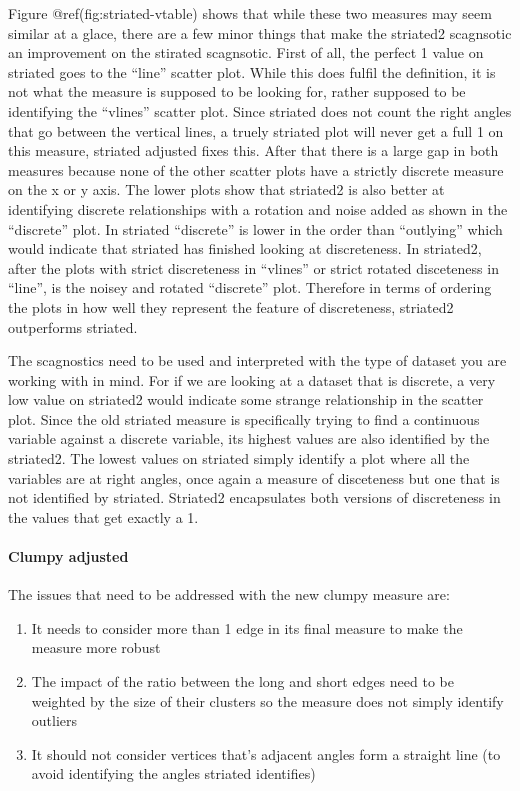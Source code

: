 Figure @ref(fig:striated-vtable) shows that while these two measures may
seem similar at a glace, there are a few minor things that make the
striated2 scagnsotic an improvement on the stirated scagnsotic. First of
all, the perfect 1 value on striated goes to the ``line'' scatter plot.
While this does fulfil the definition, it is not what the measure is
supposed to be looking for, rather supposed to be identifying the
``vlines'' scatter plot. Since striated does not count the right angles
that go between the vertical lines, a truely striated plot will never
get a full 1 on this measure, striated adjusted fixes this. After that
there is a large gap in both measures because none of the other scatter
plots have a strictly discrete measure on the x or y axis. The lower
plots show that striated2 is also better at identifying discrete
relationships with a rotation and noise added as shown in the
``discrete'' plot. In striated ``discrete'' is lower in the order than
``outlying'' which would indicate that striated has finished looking at
discreteness. In striated2, after the plots with strict discreteness in
``vlines'' or strict rotated disceteness in ``line'', is the noisey and
rotated ``discrete'' plot. Therefore in terms of ordering the plots in
how well they represent the feature of discreteness, striated2
outperforms striated.

The scagnostics need to be used and interpreted with the type of dataset
you are working with in mind. For if we are looking at a dataset that is
discrete, a very low value on striated2 would indicate some strange
relationship in the scatter plot. Since the old striated measure is
specifically trying to find a continuous variable against a discrete
variable, its highest values are also identified by the striated2. The
lowest values on striated simply identify a plot where all the variables
are at right angles, once again a measure of disceteness but one that is
not identified by striated. Striated2 encapsulates both versions of
discreteness in the values that get exactly a 1.

\hypertarget{clumpy-adjusted}{%
\paragraph{Clumpy adjusted}\label{clumpy-adjusted}}

The issues that need to be addressed with the new clumpy measure are:

\begin{enumerate}
\def\labelenumi{\arabic{enumi}.}
\tightlist
\item
  It needs to consider more than 1 edge in its final measure to make the
  measure more robust
\item
  The impact of the ratio between the long and short edges need to be
  weighted by the size of their clusters so the measure does not simply
  identify outliers
\item
  It should not consider vertices that's adjacent angles form a straight
  line (to avoid identifying the angles striated identifies)
\end{enumerate}

